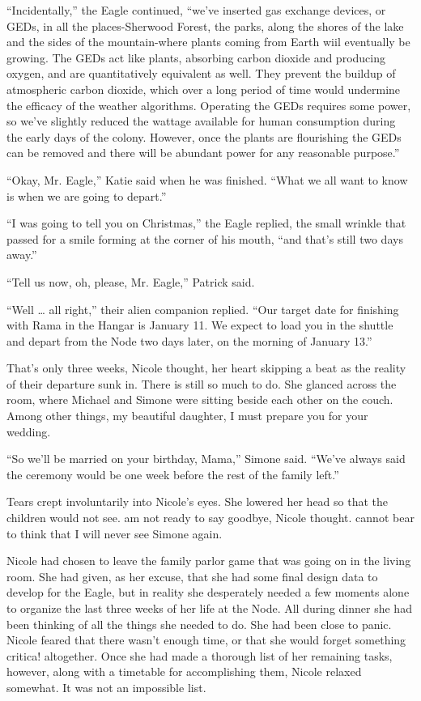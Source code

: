 \documentclass[]{article}
\begin{document}
{“Incidentally,” the Eagle continued, “we’ve inserted gas exchange devices, or GEDs, in all the places-Sherwood Forest, the parks, along the shores of the lake and the sides of the mountain-where plants coming from Earth wiil eventually be growing. The GEDs act like plants, absorbing carbon dioxide and producing oxygen, and are quantitatively equivalent as well. They prevent the buildup of atmospheric carbon dioxide, which over a long period of time would undermine the efficacy of the weather algorithms. Operating the GEDs requires some power, so we’ve slightly reduced the wattage available for human consumption during the early days of the colony. However, once the plants are flourishing the GEDs can be removed and there will be abundant power for any reasonable purpose.”

“Okay, Mr. Eagle,” Katie said when he was finished. “What we all want to know is when we are going to depart.”

“I was going to tell you on Christmas,” the Eagle replied, the small wrinkle that passed for a smile forming at the corner of his mouth, “and that’s still two days away.”

“Tell us now, oh, please, Mr. Eagle,” Patrick said.

“Well … all right,” their alien companion replied. “Our target date for finishing with Rama in the Hangar is January 11. We expect to load you in the shuttle and depart from the Node two days later, on the morning of January 13.”

That’s only three weeks, Nicole thought, her heart skipping a beat as the reality of their departure sunk in. There is still so much to do. She glanced across the room, where Michael and Simone were sitting beside each other on the couch. Among other things, my beautiful daughter, I must prepare you for your wedding.

“So we’ll be married on your birthday, Mama,” Simone said. “We’ve always said the ceremony would be one week before the rest of the family left.”

Tears crept involuntarily into Nicole’s eyes. She lowered her head so that the children would not see. am not ready to say goodbye, Nicole thought. cannot bear to think that I will never see Simone again.

Nicole had chosen to leave the family parlor game that was going on in the living room. She had given, as her excuse, that she had some final design data to develop for the Eagle, but in reality she desperately needed a few moments alone to organize the last three weeks of her life at the Node. All during dinner she had been thinking of all the things she needed to do. She had been close to panic. Nicole feared that there wasn’t enough time, or that she would forget something critica! altogether. Once she had made a thorough list of her remaining tasks, however, along with a timetable for accomplishing them, Nicole relaxed somewhat. It was not an impossible list.

}
\end{document}
